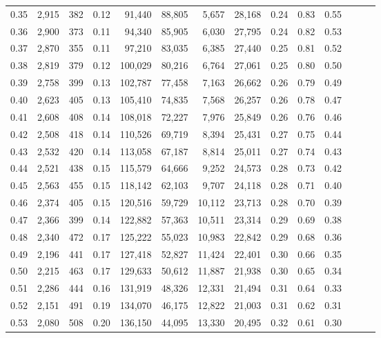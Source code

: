 \begin{tabular}{rrrrrrrrrrrrrr}
0.35 &  2,915 &  382 &  0.12 &   91,440 &   88,805 &   5,657 &  28,168 &  0.24 &  0.83 &      0.55 \\
0.36 &  2,900 &  373 &  0.11 &   94,340 &   85,905 &   6,030 &  27,795 &  0.24 &  0.82 &      0.53 \\
0.37 &  2,870 &  355 &  0.11 &   97,210 &   83,035 &   6,385 &  27,440 &  0.25 &  0.81 &      0.52 \\
0.38 &  2,819 &  379 &  0.12 &  100,029 &   80,216 &   6,764 &  27,061 &  0.25 &  0.80 &      0.50 \\
0.39 &  2,758 &  399 &  0.13 &  102,787 &   77,458 &   7,163 &  26,662 &  0.26 &  0.79 &      0.49 \\
0.40 &  2,623 &  405 &  0.13 &  105,410 &   74,835 &   7,568 &  26,257 &  0.26 &  0.78 &      0.47 \\
0.41 &  2,608 &  408 &  0.14 &  108,018 &   72,227 &   7,976 &  25,849 &  0.26 &  0.76 &      0.46 \\
0.42 &  2,508 &  418 &  0.14 &  110,526 &   69,719 &   8,394 &  25,431 &  0.27 &  0.75 &      0.44 \\
0.43 &  2,532 &  420 &  0.14 &  113,058 &   67,187 &   8,814 &  25,011 &  0.27 &  0.74 &      0.43 \\
0.44 &  2,521 &  438 &  0.15 &  115,579 &   64,666 &   9,252 &  24,573 &  0.28 &  0.73 &      0.42 \\
0.45 &  2,563 &  455 &  0.15 &  118,142 &   62,103 &   9,707 &  24,118 &  0.28 &  0.71 &      0.40 \\
0.46 &  2,374 &  405 &  0.15 &  120,516 &   59,729 &  10,112 &  23,713 &  0.28 &  0.70 &      0.39 \\
0.47 &  2,366 &  399 &  0.14 &  122,882 &   57,363 &  10,511 &  23,314 &  0.29 &  0.69 &      0.38 \\
0.48 &  2,340 &  472 &  0.17 &  125,222 &   55,023 &  10,983 &  22,842 &  0.29 &  0.68 &      0.36 \\
0.49 &  2,196 &  441 &  0.17 &  127,418 &   52,827 &  11,424 &  22,401 &  0.30 &  0.66 &      0.35 \\
0.50 &  2,215 &  463 &  0.17 &  129,633 &   50,612 &  11,887 &  21,938 &  0.30 &  0.65 &      0.34 \\
0.51 &  2,286 &  444 &  0.16 &  131,919 &   48,326 &  12,331 &  21,494 &  0.31 &  0.64 &      0.33 \\
0.52 &  2,151 &  491 &  0.19 &  134,070 &   46,175 &  12,822 &  21,003 &  0.31 &  0.62 &      0.31 \\
0.53 &  2,080 &  508 &  0.20 &  136,150 &   44,095 &  13,330 &  20,495 &  0.32 &  0.61 &      0.30 \\

\end{tabular}
